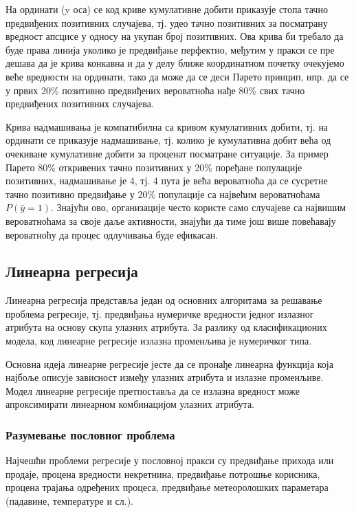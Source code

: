 На ординати (y оса) се код криве кумулативне добити приказује стопа тачно предвиђених позитивних случајева, тј. удео тачно позитивних за посматрану вредност апсцисе у односу на укупан број позитивних. Ова крива би требало да буде права линија уколико је предвиђање перфектно, међутим у пракси се пре дешава да је крива конкавна и да у делу ближе координатном почетку очекујемо веће вредности на ординати, тако да може да се деси Парето принцип, нпр. да се у првих 20\% позитивно предвиђених вероватноћа нађе 80\% свих тачно предвиђених позитивних случајева.

Крива надмашивања је компатибилна са кривом кумулативних добити, тј. на ординати се приказује надмашивање, тј. колико је кумулативна добит већа од очекиване кумулативне добити за проценат посматране ситуације. За пример Парето 80\% откривених тачно позитивних у 20\% поређане популације позитивних, надмашивање је 4, тј. 4 пута је већа вероватноћа да се сусретне тачно позитивно предвиђање у 20\% популације са највећим вероватноћама $P(\hat{y} = 1)$. Знајући ово, организације често користе само случајеве са највишим вероватноћама за своје даље активности, знајући да тиме још више повећавају вероватноћу да процес одлучивања буде ефикасан.

\subsection{Линеарна регресија}
Линеарна регресија представља један од основних алгоритама за решавање проблема регресије, тј. предвиђања нумеричке вредности једног излазног атрибута на основу скупа улазних атрибута. За разлику од класификационих модела, код линеарне регресије излазна променљива је нумеричког типа.

Основна идеја линеарне регресије јесте да се пронађе линеарна функција која најбоље описује зависност између улазних атрибута и излазне променљиве. Модел линеарне регресије претпоставља да се излазна вредност може апроксимирати линеарном комбинацијом улазних атрибута.

\subsubsection{Разумевање пословног проблема}
Најчешћи проблеми регресије у пословној пракси су предвиђање прихода или продаје, процена вредности некретнина, предвиђање потрошње корисника, процена трајања одређених процеса, предвиђање метеоролошких параметара (падавине, температуре и сл.).

